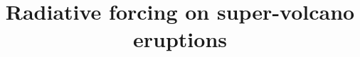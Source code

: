 \documentclass{ametsocV6.1}
\title{Radiative forcing on super-volcano eruptions}
\affiliation{
  \aff{a}{UiT The Arctic University of Norway, Tromsø, Norway}
}
\begin{document}
\maketitle{} \glsresetall{}

%
%
%
%
%
%

%



\end{document}
